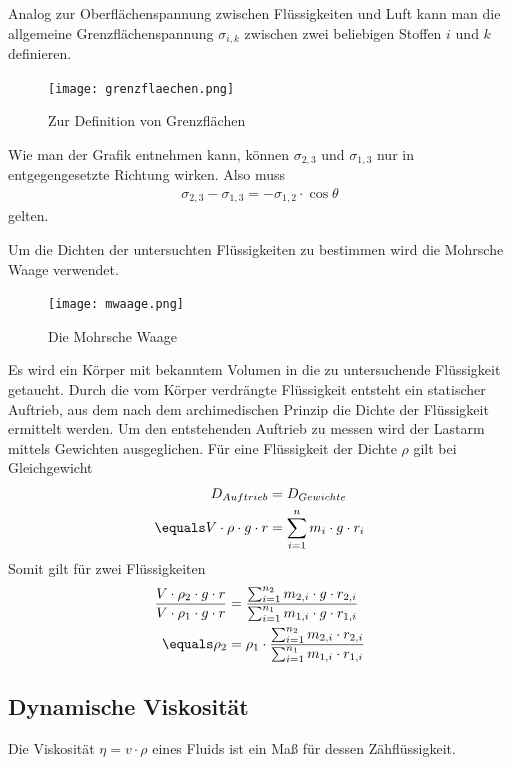\documentclass[12pt, a4paper, twoside]{scrartcl}
\begin{document}
Analog zur Oberflächenspannung zwischen Flüssigkeiten und Luft kann man die allgemeine Grenzflächenspannung $\sigma_{i,k}$ zwischen zwei beliebigen Stoffen $i$ und $k$ definieren.
\begin{figure} [h]
\centering
\texttt{[image: grenzflaechen.png]}
\caption{Zur Definition von Grenzflächen\protect\footnotemark}
\end{figure}

Wie man der Grafik entnehmen kann, können $\sigma_{2,3}$ und $\sigma_{1,3}$ nur in entgegengesetzte Richtung wirken. Also muss
\begin{align*}
 \sigma_{2,3}-\sigma_{1,3}=-\sigma_{1,2}\cdot\cos\theta
\end{align*}
gelten.\newline

Um die Dichten der untersuchten Flüssigkeiten zu bestimmen wird die Mohrsche Waage verwendet.

\begin{figure} [h]
\centering
\texttt{[image: mwaage.png]}
\caption{Die Mohrsche Waage\protect\footnotemark}
\end{figure}

Es wird ein Körper mit bekanntem Volumen in die zu untersuchende Flüssigkeit getaucht. Durch die vom Körper verdrängte Flüssigkeit entsteht ein statischer Auftrieb, aus dem nach dem archimedischen Prinzip die Dichte der Flüssigkeit ermittelt werden. Um den entstehenden Auftrieb zu messen wird der Lastarm mittels Gewichten ausgeglichen.
Für eine Flüssigkeit der Dichte $\rho$ gilt bei Gleichgewicht
\begin{align}
 D_{Auftrieb} &= D_{Gewichte} \nonumber\\
\equals  V\cdot\rho\cdot g \cdot r &= \sum_{i=1}^{n}m_i\cdot g\cdot r_i
\end{align}
Somit gilt für zwei Flüssigkeiten
\begin{align}
\frac{V\cdot\rho_2\cdot g \cdot r}{V\cdot\rho_1\cdot g \cdot r} &= \frac{\sum_{i=1}^{n_2}m_{2,i}\cdot g\cdot r_{2,i}}{\sum_{i=1}^{n_1}m_{1,i}\cdot g\cdot r_{1,i}} \nonumber\\
\equals \rho_2 &= \rho_1 \cdot \frac{\sum_{i=1}^{n_2}m_{2,i}\cdot r_{2,i}}{\sum_{i=1}^{n_1}m_{1,i}\cdot r_{1,i}} \label{eq:mohrsche_waage}
\end{align}


\subsection{Dynamische Viskosität}
Die Viskosität $\eta=v\cdot\rho$ eines Fluids ist ein Maß für dessen Zähflüssigkeit.\linebreak
\end{document}
